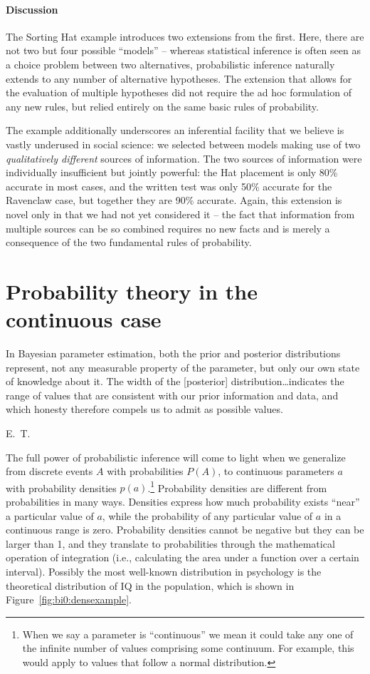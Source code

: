 \paragraph{Discussion} The  {Sorting Hat} example introduces two extensions from the first. Here, there are not two but four possible ``models'' -- whereas statistical inference is often seen as a choice problem between two alternatives, probabilistic inference naturally extends to any number of alternative hypotheses. The extension that allows for the evaluation of multiple hypotheses did not require the ad hoc formulation of any new rules, but relied entirely on the same basic rules of probability. 

 The example {additionally} underscores an inferential facility that we believe is vastly underused in social science: we selected between models making use of two \emph{ qualitatively different} sources of information. The two sources of information were individually insufficient but jointly powerful{: the Hat placement is only 80\% accurate in most cases, and the written test was only 50\% accurate for the Ravenclaw case, but together they are 90\% accurate}.
Again, this extension is novel only in that we had not yet considered it --  {the fact} that information from multiple sources can be so combined {requires no new facts and is merely a consequence of the two fundamental rules of probability}.

\section{Probability theory in the continuous case}
\epigraph{{In Bayesian parameter estimation, both the prior and posterior distributions represent, not any measurable property of the parameter, but only our own state of knowledge about it. The width of the [posterior] distribution\dots indicates the range of values that are consistent with our prior information and data, and which honesty therefore compels us to admit as possible values.}}{E.~T.~}

The full power of probabilistic inference will come to light when we generalize from discrete events $A$ with probabilities $P(A)$, to continuous parameters $a$ with probability densities $p(a)$.\footnote{When we say a parameter is ``continuous'' we mean it could take any one of the infinite number of values comprising some continuum. For example, this would apply to values that follow a normal distribution.}  
Probability densities are different from probabilities in many ways. Densities express how much probability exists ``near'' a particular value of $a$, while the probability of any particular value of $a$ in a continuous range is zero. 
Probability densities cannot be negative but they can be larger than 1, and they translate to probabilities through the mathematical operation of integration (i.e., calculating the area under a function over a certain interval). Possibly the most well-known distribution in psychology is the theoretical distribution of IQ in the population, which is shown in Figure~\ref{fig:bi0:densexample}.


